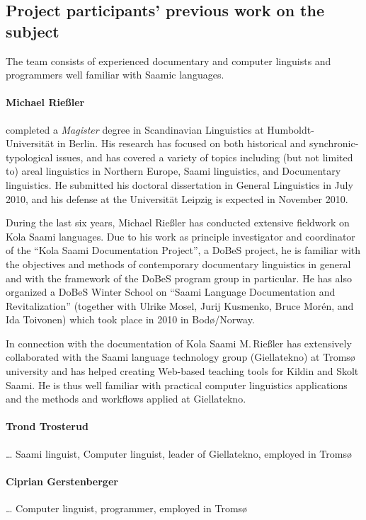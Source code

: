 \documentclass[a4paper,12pt]{article}
\begin{document}
\subsection{Project participants' previous work on the subject}
The team consists of experienced documentary and computer linguists and programmers well familiar with Saamic languages.

\paragraph{Michael Rießler} completed a \textit{Magister} degree in Scandinavian Linguistics at Humboldt-Universität in Berlin. His research has focused on both historical and synchronic-typological issues, and has covered a variety of topics including (but not limited to) areal linguistics in Northern Europe, Saami linguistics, and Documentary linguistics. He submitted his doctoral dissertation in General Linguistics in July 2010, and his defense at the Universität Leipzig is expected in November 2010.

During the last six years, Michael Rießler has conducted extensive fieldwork on Kola Saami languages. Due to his work as principle investigator and coordinator of the “Kola Saami Documentation Project”, a DoBeS project, he is familiar with the objectives and methods of contemporary documentary linguistics in general and with the framework of the DoBeS program group in particular. He has also organized a DoBeS Winter School on “Saami Language Documentation and Revitalization” (together with Ulrike Mosel, Jurij Kusmenko, Bruce Morén, and Ida Toivonen) which took place in 2010 in Bodø/Norway.

In connection with the documentation of Kola Saami M.\,Rießler has extensively collaborated with the Saami language technology group (Giellatekno) at Tromsø university and has helped creating Web-based teaching tools for Kildin and Skolt Saami. He is thus well familiar with practical computer linguistics applications and the methods and workflows applied at Giellatekno.

\paragraph{Trond Trosterud} … Saami linguist, Computer linguist, leader of Giellatekno, employed in Tromsø

\paragraph{Ciprian Gerstenberger} … Computer linguist, programmer, employed in Tromsø
\end{document}
